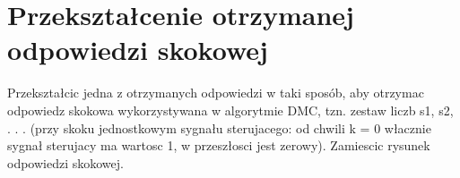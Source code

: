 \section{Przekształcenie otrzymanej odpowiedzi skokowej}

Przekształcic jedna z otrzymanych odpowiedzi w taki sposób, aby otrzymac odpowiedz
skokowa wykorzystywana w algorytmie DMC, tzn. zestaw liczb s1, s2, . . . (przy skoku
jednostkowym sygnału sterujacego: od chwili k = 0 włacznie sygnał sterujacy ma
wartosc 1, w przeszłosci jest zerowy). Zamiescic rysunek odpowiedzi skokowej.
